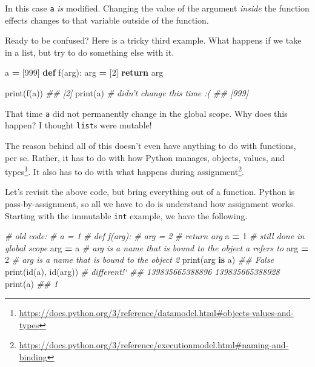 \documentclass[12pt,krantz2]{krantz}
\makeatletter
\newenvironment{Shaded}{\begin{snugshade}}{\end{snugshade}}
\newcommand{\BuiltInTok}[1]{#1}
\newcommand{\CommentTok}[1]{\textcolor[rgb]{0.37,0.37,0.37}{\textit{#1}}}
\newcommand{\ControlFlowTok}[1]{\textcolor[rgb]{0.27,0.27,0.27}{\textbf{#1}}}
\newcommand{\DecValTok}[1]{\textcolor[rgb]{0.06,0.06,0.06}{#1}}
\newcommand{\KeywordTok}[1]{\textcolor[rgb]{0.27,0.27,0.27}{\textbf{#1}}}
\newcommand{\NormalTok}[1]{#1}
\newcommand{\OperatorTok}[1]{\textcolor[rgb]{0.43,0.43,0.43}{\textbf{#1}}}
\renewcommand{\href}[2]{#2\footnote{\url{#1}}}
\newenvironment{kframe}{%
\medskip{}
\setlength{\fboxsep}{.8em}
 \def\at@end@of@kframe{}%
 \ifinner\ifhmode%
  \def\at@end@of@kframe{\end{minipage}}%
  \begin{minipage}{\columnwidth}%
 \fi\fi%
 \def\FrameCommand##1{\hskip\@totalleftmargin \hskip-\fboxsep
 \colorbox{shadecolor}{##1}\hskip-\fboxsep
     \hskip-\linewidth \hskip-\@totalleftmargin \hskip\columnwidth}%
 \MakeFramed {\advance\hsize-\width
   \@totalleftmargin\z@ \linewidth\hsize
   \@setminipage}}%
 {\par\unskip\endMakeFramed%
 \at@end@of@kframe}
\renewenvironment{Shaded}{\begin{kframe}}{\end{kframe}}
\makeatother
\begin{document}
In this case \texttt{a} \emph{is} modified. Changing the value of the argument \emph{inside} the function effects changes to that variable outside of the function.

Ready to be confused? Here is a tricky third example. What happens if we take in a list, but try to do something else with it.

\begin{Shaded}
\begin{Highlighting}[]
\NormalTok{a }\OperatorTok{=}\NormalTok{ [}\DecValTok{999}\NormalTok{]}
\KeywordTok{def}\NormalTok{ f(arg):}
\NormalTok{    arg }\OperatorTok{=}\NormalTok{ [}\DecValTok{2}\NormalTok{]}
    \ControlFlowTok{return}\NormalTok{ arg}

\BuiltInTok{print}\NormalTok{(f(a))}
\CommentTok{## [2]}
\BuiltInTok{print}\NormalTok{(a) }\CommentTok{# didn't change this time :(}
\CommentTok{## [999]}
\end{Highlighting}
\end{Shaded}

That time \texttt{a} did not permanently change in the global scope. Why does this happen? I thought \texttt{list}s were mutable!

The reason behind all of this doesn't even have anything to do with functions, per se. Rather, it has to do with how Python manages, \href{https://docs.python.org/3/reference/datamodel.html\#objects-values-and-types}{objects, values, and types}. It also has to do with what happens during \href{https://docs.python.org/3/reference/executionmodel.html\#naming-and-binding}{assignment}.

Let's revisit the above code, but bring everything out of a function. Python is pass-by-assignment, so all we have to do is understand how assignment works. Starting with the immutable \texttt{int} example, we have the following.

\begin{Shaded}
\begin{Highlighting}[]
\CommentTok{# old code: }
\CommentTok{# a = 1}
\CommentTok{# def f(arg):}
\CommentTok{#     arg = 2}
\CommentTok{#     return arg}
\NormalTok{a }\OperatorTok{=} \DecValTok{1}    \CommentTok{# still done in global scope}
\NormalTok{arg }\OperatorTok{=}\NormalTok{ a  }\CommentTok{# arg is a name that is bound to the object a refers to}
\NormalTok{arg }\OperatorTok{=} \DecValTok{2}  \CommentTok{# arg is a name that is bound to the object 2}
\BuiltInTok{print}\NormalTok{(arg }\KeywordTok{is}\NormalTok{ a)}
\CommentTok{## False}
\BuiltInTok{print}\NormalTok{(}\BuiltInTok{id}\NormalTok{(a), }\BuiltInTok{id}\NormalTok{(arg)) }\CommentTok{# different!`}
\CommentTok{## 139835665388896 139835665388928}
\BuiltInTok{print}\NormalTok{(a)}
\CommentTok{## 1}
\end{Highlighting}
\end{Shaded}
\end{document}
